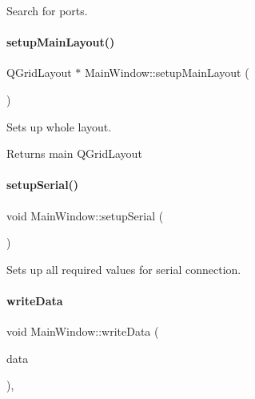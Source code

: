 Search for ports. 

\mbox{\label{classMainWindow_a19f1d3f1ccdc04be0f5f63f0c99264f4}} 
\paragraph{\texorpdfstring{setup\+Main\+Layout()}{setupMainLayout()}}
{\footnotesize\ttfamily Q\+Grid\+Layout $\ast$ Main\+Window\+::setup\+Main\+Layout (\begin{DoxyParamCaption}{ }\end{DoxyParamCaption})\hspace{0.3cm}{\ttfamily [private]}}



Sets up whole layout. 

\begin{DoxyReturn}{Returns}
main Q\+Grid\+Layout 
\end{DoxyReturn}
\mbox{\label{classMainWindow_a74ab7a387068bddadc3e665ba64b73b8}} 
\paragraph{\texorpdfstring{setup\+Serial()}{setupSerial()}}
{\footnotesize\ttfamily void Main\+Window\+::setup\+Serial (\begin{DoxyParamCaption}{ }\end{DoxyParamCaption})\hspace{0.3cm}{\ttfamily [private]}}



Sets up all required values for serial connection. 

\mbox{\label{classMainWindow_a76237574ac5c68506bcb9b9de468fda2}} 
\paragraph{\texorpdfstring{write\+Data}{writeData}}
{\footnotesize\ttfamily void Main\+Window\+::write\+Data (\begin{DoxyParamCaption}\item[{const Q\+Byte\+Array \&}]{data }\end{DoxyParamCaption})\hspace{0.3cm}{\ttfamily [private]}, {\ttfamily [slot]}}



